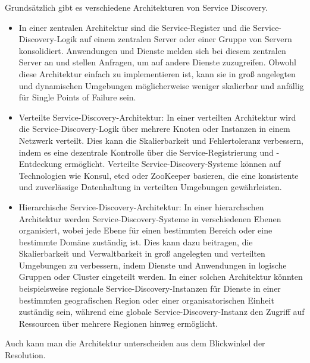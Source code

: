 Grundsätzlich gibt es verschiedene Architekturen von Service Discovery.
\begin{itemize}
\item In einer zentralen Architektur sind die Service-Register und die Service-Discovery-Logik auf einem zentralen Server oder einer Gruppe von Servern konsolidiert. Anwendungen und Dienste melden sich bei diesem zentralen Server an und stellen Anfragen, um auf andere Dienste zuzugreifen. Obwohl diese Architektur einfach zu implementieren ist, kann sie in groß angelegten und dynamischen Umgebungen möglicherweise weniger skalierbar und anfällig für Single Points of Failure sein.
\item Verteilte Service-Discovery-Architektur: In einer verteilten Architektur wird die Service-Discovery-Logik über mehrere Knoten oder Instanzen in einem Netzwerk verteilt. Dies kann die Skalierbarkeit und Fehlertoleranz verbessern, indem es eine dezentrale Kontrolle über die Service-Registrierung und -Entdeckung ermöglicht. Verteilte Service-Discovery-Systeme können auf Technologien wie Konsul, etcd oder ZooKeeper basieren, die eine konsistente und zuverlässige Datenhaltung in verteilten Umgebungen gewährleisten.

\item Hierarchische Service-Discovery-Architektur: In einer hierarchschen Architektur werden Service-Discovery-Systeme in verschiedenen Ebenen organisiert, wobei jede Ebene für einen bestimmten Bereich oder eine bestimmte Domäne zuständig ist. Dies kann dazu beitragen, die Skalierbarkeit und Verwaltbarkeit in groß angelegten und verteilten Umgebungen zu verbessern, indem Dienste und Anwendungen in logische Gruppen oder Cluster eingeteilt werden. In einer solchen Architektur könnten beispielsweise regionale Service-Discovery-Instanzen für Dienste in einer bestimmten geografischen Region oder einer organisatorischen Einheit zuständig sein, während eine globale Service-Discovery-Instanz den Zugriff auf Ressourcen über mehrere Regionen hinweg ermöglicht.
\end{itemize}

Auch kann man die Architektur unterscheiden aus dem Blickwinkel der Resolution. 


